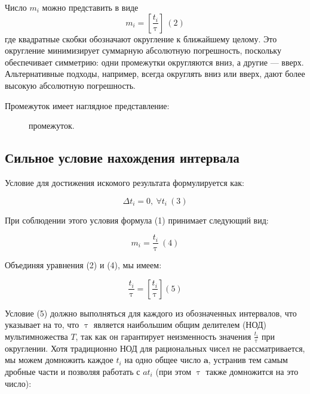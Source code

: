 \documentclass[12pt]{report}
\let\tau\uptau
\begin{document}
Число $m_i$ можно представить в виде
$$m_i=\left[\frac{t_i}{\tau}\right]\ (2)$$
где квадратные скобки обозначают округление к ближайшему целому. Это округление минимизирует суммарную абсолютную погрешность, поскольку обеспечивает симметрию: одни промежутки округляются вниз, а другие — вверх. Альтернативные подходы, например, всегда округлять вниз или вверх, дают более высокую абсолютную погрешность.

Промежуток имеет наглядное представление:
\begin{figure}[ht]
    \centering
    \caption{промежуток.}
\end{figure}

\subsection{Сильное условие нахождения интервала}\label{sec:GCF}

Условие для достижения искомого результата формулируется как: 

$$\Delta t_i=0,\ \forall t_i\ (3)$$

При соблюдении этого условия формула (1) принимает следующий вид:

$$m_i=\frac{t_i}{\tau}\ (4)$$

Объединяя уравнения (2) и (4), мы имеем:

$$\frac{t_i}{\tau}=\left[ \frac{t_i}{\tau} \right] (5)$$

Условие (5) должно выполняться для каждого из обозначенных интервалов, что указывает на то, что $\tau$ является наибольшим общим делителем (НОД) мультимножества $T$, так как он гарантирует неизменность значения $\frac{t_i}{\tau}$ при округлении. Хотя традиционно НОД для рациональных чисел не рассматривается, мы можем домножить каждое $t_i$ на одно общее число $\bm{a}$, устранив тем самым дробные части и позволяя работать с $at_i$ (при этом $\tau$ также домножится на это число):
\end{document}

